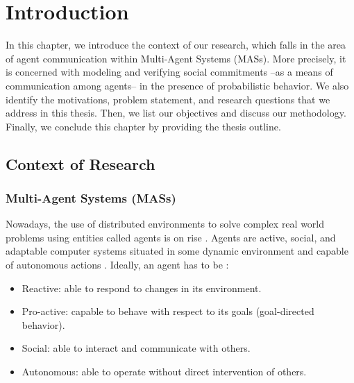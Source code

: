 %

\setcounter{chapter}{0}

\chapter{Introduction}\label{cha:introduction}

In this chapter, we introduce the context of our research, which falls in the area of agent communication within Multi-Agent Systems (MASs). More precisely, it is concerned with modeling and verifying social commitments --as a means of communication among agents-- in the presence of probabilistic behavior. We also identify the motivations, problem statement, and research questions that we address in this thesis. Then, we list our objectives and discuss our methodology. Finally, we conclude this chapter by providing the thesis outline.


\section{Context of Research} \label{sec:context-chap1}

\subsection{Multi-Agent Systems (MASs)}
Nowadays, the use of distributed environments to solve complex
real world problems using entities called agents is on rise
\cite{Biswas08,Park2005}. Agents are active, social, and adaptable computer systems situated in some dynamic environment and capable of autonomous actions \cite{Wooldridge2009}. %
Ideally, an agent has to be \cite{Wooldridge1995}:

\begin{itemize}
\item Reactive: able to respond to changes in its environment.
\item Pro-active: capable to behave with respect to its goals (goal-directed behavior).
\item Social: able to interact and communicate with others.
\item Autonomous: able to operate without direct intervention of others.
\end{itemize}

